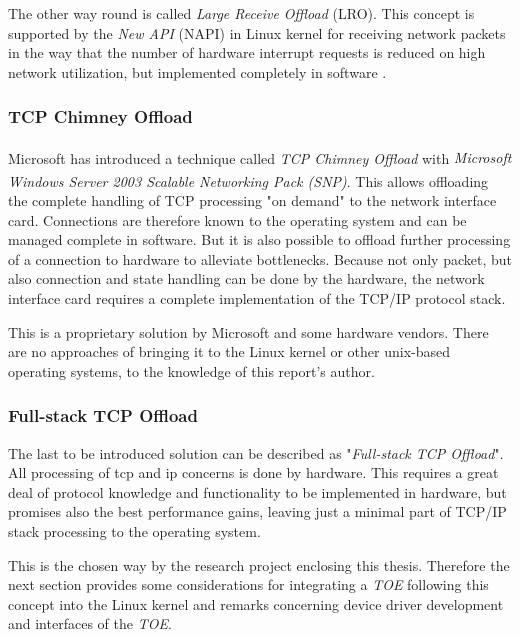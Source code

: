 The other way round is called \textit{Large Receive Offload} (LRO). This concept is supported by the \textit{New API} (NAPI) in Linux kernel for receiving network packets in the way that the number of hardware interrupt requests is reduced on high network utilization, but implemented completely in software \cite{linux-lro}.
\\

\subsubsection{TCP Chimney Offload}

Microsoft has introduced a technique called \textit{TCP Chimney Offload} with \textit{Microsoft\textsuperscript{\textregistered} Windows Server\textsuperscript{\textregistered} 2003 Scalable Networking Pack (SNP)}. This allows offloading the complete handling of TCP processing "on demand" to the network interface card. Connections are therefore known to the operating system and can be managed complete in software. But it is also possible to offload further processing of a connection to hardware to alleviate bottlenecks. Because not only packet, but also connection and state handling can be done by the hardware, the network interface card requires a complete implementation of the TCP/IP protocol stack. \cite{dell-toe}

This is a proprietary solution by Microsoft and some hardware vendors. There are no approaches of bringing it to the Linux kernel or other unix-based operating systems, to the knowledge of this report's author.
\\

\subsubsection{Full-stack TCP Offload}

The last to be introduced solution can be described as "\textit{Full-stack TCP Offload}". All processing of \gls{tcp} and \gls{ip} concerns is done by hardware. This requires a great deal of protocol knowledge and functionality to be implemented in hardware, but promises also the best performance gains, leaving just a minimal part of TCP/IP stack processing to the operating system.

This is the chosen way by the research project enclosing this thesis. Therefore the next section provides some considerations for integrating a \textit{TOE} following this concept into the Linux kernel and remarks concerning device driver development and interfaces of the \textit{TOE}.
\\

